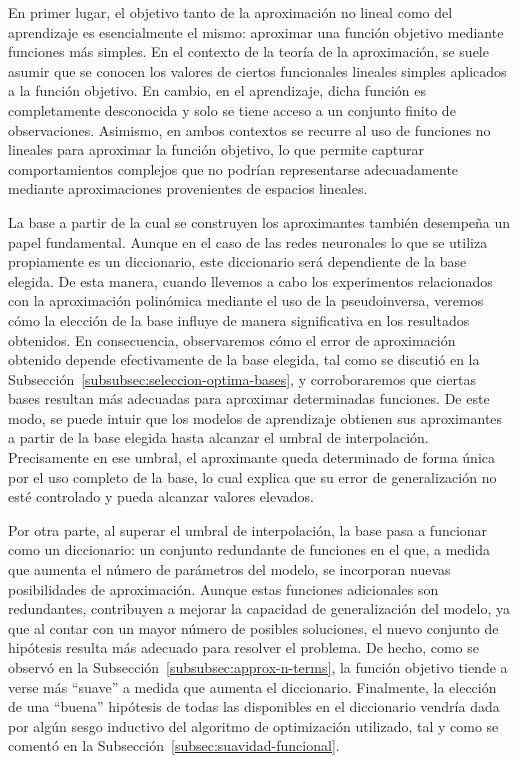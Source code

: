 En primer lugar, el objetivo tanto de la aproximación no lineal como del aprendizaje es esencialmente el mismo: aproximar una función objetivo mediante funciones más simples. En el contexto de la teoría de la aproximación, se suele asumir que se conocen los valores de ciertos funcionales lineales simples aplicados a la función objetivo. En cambio, en el aprendizaje, dicha función es completamente desconocida y solo se tiene acceso a un conjunto finito de observaciones. Asimismo, en ambos contextos se recurre al uso de funciones no lineales para aproximar la función objetivo, lo que permite capturar comportamientos complejos que no podrían representarse adecuadamente mediante aproximaciones provenientes de espacios lineales.\newline

La base a partir de la cual se construyen los aproximantes también desempeña un papel fundamental. Aunque en el caso de las redes neuronales lo que se utiliza propiamente es un diccionario, este diccionario será dependiente de la base elegida. De esta manera, cuando llevemos a cabo los experimentos relacionados con la aproximación polinómica mediante el uso de la pseudoinversa, veremos cómo la elección de la base influye de manera significativa en los resultados obtenidos. En consecuencia, observaremos cómo el error de aproximación obtenido depende efectivamente de la base elegida, tal como se discutió en la Subsección~\ref{subsubsec:seleccion-optima-bases}, y corroboraremos que ciertas bases resultan más adecuadas para aproximar determinadas funciones. De este modo, se puede intuir que los modelos de aprendizaje obtienen sus aproximantes a partir de la base elegida hasta alcanzar el umbral de interpolación. Precisamente en ese umbral, el aproximante queda determinado de forma única por el uso completo de la base, lo cual explica que su error de generalización no esté controlado y pueda alcanzar valores elevados.\newline

Por otra parte, al superar el umbral de interpolación, la base pasa a funcionar como un diccionario: un conjunto redundante de funciones en el que, a medida que aumenta el número de parámetros del modelo, se incorporan nuevas posibilidades de aproximación. Aunque estas funciones adicionales son redundantes, contribuyen a mejorar la capacidad de generalización del modelo, ya que al contar con un mayor número de posibles soluciones, el nuevo conjunto de hipótesis resulta más adecuado para resolver el problema. De hecho, como se observó en la Subsección~\ref{subsubsec:approx-n-terms}, la función objetivo tiende a verse más “suave” a medida que aumenta el diccionario. Finalmente, la elección de una ``buena'' hipótesis de todas las disponibles en el diccionario vendría dada por algún sesgo inductivo del algoritmo de optimización utilizado, tal y como se comentó en la Subsección~\ref{subsec:suavidad-funcional}.

